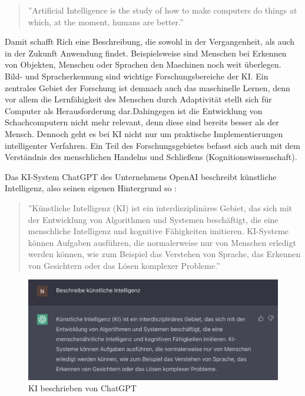 \documentclass[a4paper,12pt, german]{report}
\begin{document}
 \begin{quote}
  ''Artificial Intelligence is the study of how to make computers do things at which, at the moment, humans are better.''
 \end{quote} 

 Damit schafft Rich eine Beschreibung, die sowohl in der Vergangenheit, als auch in der Zukunft Anwendung findet. Beispielsweise sind Menschen bei Erkennen von Objekten, Menschen oder Sprachen den Maschinen noch weit überlegen. Bild- und Spracherkennung sind wichtige Forschungsbereiche der KI. Ein zentrales Gebiet der Forschung ist demnach auch das maschinelle Lernen, denn vor allem die Lernfähigkeit des Menschen durch Adaptivität stellt sich für Computer als Herausforderung dar.Dahingegen ist die Entwicklung von Schachcomputern nicht mehr relevant, denn diese sind bereits besser als der Mensch. Dennoch geht es bei KI nicht nur um praktische Implementierungen intelligenter Verfahren. Ein Teil des Forschungsgebietes befasst sich auch mit dem Verständnis des menschlichen Handelns und Schließens (Kognitionswissenschaft).
 \cite{11}

Das KI-System ChatGPT des Unternehmens OpenAI beschreibt künstliche Intelligenz, also seinen eigenen Hintergrund so \cite{04}:
\begin{quote}
  ''Künstliche Intelligenz (KI) ist ein interdisziplinäres Gebiet, das sich mit der Entwicklung von Algorithmen und Systemen beschäftigt, die eine menschliche Intelligenz und kognitive Fähigkeiten imitieren. KI-Systeme können Aufgaben ausführen, die normalerweise nur von Menschen erledigt werden können, wie zum Beispiel das Verstehen von Sprache, das Erkennen von Gesichtern oder das Lösen komplexer Probleme.''
\end{quote}

\begin{figure}[H]
  \center
 \includegraphics[width=14cm]{images/ChatGPT.png}
  \caption[KI beschrieben von ChatGPT]{KI beschrieben von ChatGPT \cite{04}}
\end{figure}
\end{document}
